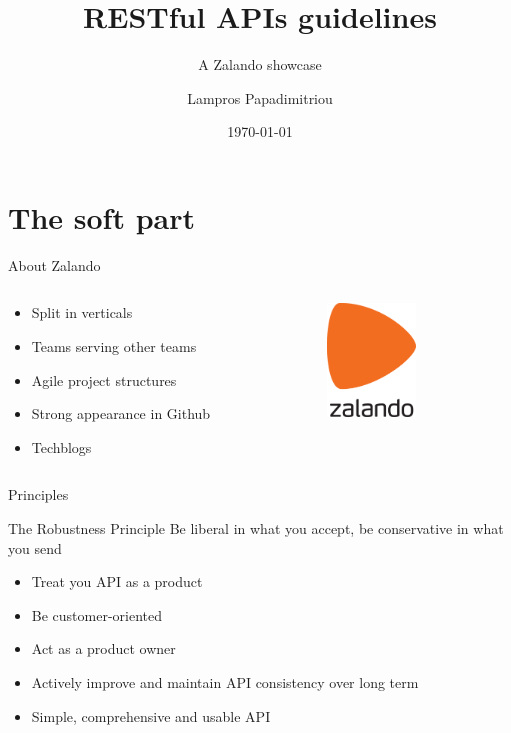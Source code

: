 \documentclass[10pt]{beamer}
\title{RESTful APIs guidelines}
\subtitle{A Zalando showcase}
\date{\today}
\author{Lampros Papadimitriou}
\institute{Check24 Baufinanzierung GmbH}
\begin{document}
\maketitle

\section{The soft part}

\begin{frame}{About Zalando}
  \begin{columns}
	  \begin{column}{0.5\textwidth}
			\begin{itemize}
				\item Split in verticals
				\item Teams serving other teams
				\item Agile project structures
				\item Strong appearance in Github
				\item Techblogs
			\end{itemize}
		\end{column}
		\begin{column}{0.5\textwidth}
			\begin{center}
				\includegraphics[height=3cm]{zalando-logo.pdf}
			\end{center}
		\end{column}
	\end{columns}
\end{frame}

\begin{frame}{Principles}

  \begin{alertblock}{The Robustness Principle}
    Be liberal in what you accept, be conservative in what you send
  \end{alertblock}

  \begin{itemize}
    \item Treat you API as a product
    \item Be customer-oriented
    \item Act as a product owner
    \item Actively improve and maintain API consistency over long term
    \item Simple, comprehensive and usable API
  \end{itemize}

\end{frame}
\end{document}
